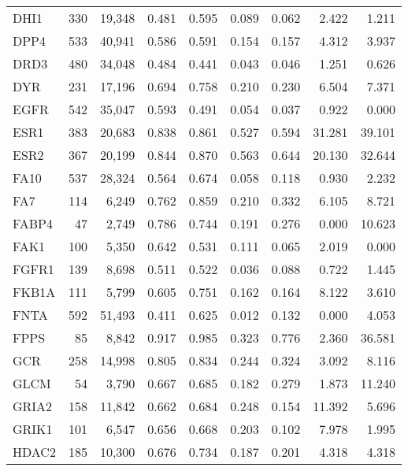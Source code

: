 \begin{center}
\begin{longtable}{lrrrrrrrr}
			DHI1   & 330   & 19,348   & 0.481   & 0.595   & 0.089   & 0.062   & 2.422   & 1.211  \\
			DPP4   & 533   & 40,941   & 0.586   & 0.591   & 0.154   & 0.157   & 4.312   & 3.937  \\
			DRD3   & 480   & 34,048   & 0.484   & 0.441   & 0.043   & 0.046   & 1.251   & 0.626  \\
			DYR    & 231   & 17,196   & 0.694   & 0.758   & 0.210   & 0.230   & 6.504   & 7.371  \\
			EGFR   & 542   & 35,047   & 0.593   & 0.491   & 0.054   & 0.037   & 0.922   & 0.000  \\
			ESR1   & 383   & 20,683   & 0.838   & 0.861   & 0.527   & 0.594   & 31.281  & 39.101 \\
			ESR2   & 367   & 20,199   & 0.844   & 0.870   & 0.563   & 0.644   & 20.130  & 32.644 \\
			FA10   & 537   & 28,324   & 0.564   & 0.674   & 0.058   & 0.118   & 0.930   & 2.232  \\
			FA7    & 114   & 6,249    & 0.762   & 0.859   & 0.210   & 0.332   & 6.105   & 8.721  \\
			FABP4  & 47    & 2,749    & 0.786   & 0.744   & 0.191   & 0.276   & 0.000   & 10.623 \\
			FAK1   & 100   & 5,350    & 0.642   & 0.531   & 0.111   & 0.065   & 2.019   & 0.000  \\
			FGFR1  & 139   & 8,698    & 0.511   & 0.522   & 0.036   & 0.088   & 0.722   & 1.445  \\
			FKB1A  & 111   & 5,799    & 0.605   & 0.751   & 0.162   & 0.164   & 8.122   & 3.610  \\
			FNTA   & 592   & 51,493   & 0.411   & 0.625   & 0.012   & 0.132   & 0.000   & 4.053  \\
			FPPS   & 85    & 8,842    & 0.917   & 0.985   & 0.323   & 0.776   & 2.360   & 36.581 \\
			GCR    & 258   & 14,998   & 0.805   & 0.834   & 0.244   & 0.324   & 3.092   & 8.116  \\
			GLCM   & 54    & 3,790    & 0.667   & 0.685   & 0.182   & 0.279   & 1.873   & 11.240 \\
			GRIA2  & 158   & 11,842   & 0.662   & 0.684   & 0.248   & 0.154   & 11.392  & 5.696  \\
			GRIK1  & 101   & 6,547    & 0.656   & 0.668   & 0.203   & 0.102   & 7.978   & 1.995  \\
			HDAC2  & 185   & 10,300   & 0.676   & 0.734   & 0.187   & 0.201   & 4.318   & 4.318  \\

\end{longtable}
\end{center}
